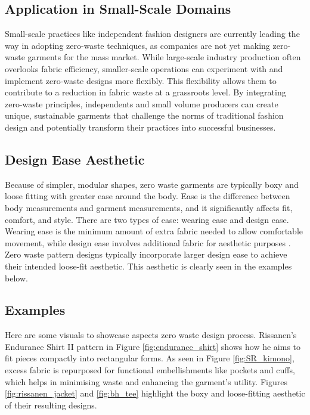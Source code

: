 \subsection{Application in Small-Scale Domains}
Small-scale practices like independent fashion designers are currently leading the way in adopting zero-waste techniques, as companies are not yet making zero-waste garments for the mass market. While large-scale industry production often overlooks fabric efficiency, smaller-scale operations can experiment with and implement zero-waste designs more flexibly. This flexibility allows them to contribute to a reduction in fabric waste at a grassroots level. By integrating zero-waste principles, independents and small volume producers can create unique, sustainable garments that challenge the norms of traditional fashion design and potentially transform their practices into successful businesses.

\subsection{Design Ease Aesthetic}
Because of simpler, modular shapes, zero waste garments are typically boxy and loose fitting with greater ease around the body. Ease is the difference between body measurements and garment measurements, and it significantly affects fit, comfort, and style. There are two types of ease: wearing ease and design ease. Wearing ease is the minimum amount of extra fabric needed to allow comfortable movement, while design ease involves additional fabric for aesthetic purposes \cite{tessa_what_2022}. Zero waste pattern designs typically incorporate larger design ease to achieve their intended loose-fit aesthetic. This aesthetic is clearly seen in the examples below.

\subsection{Examples}
Here are some visuals to showcase aspects zero waste design process. Rissanen's Endurance Shirt II pattern in Figure \ref{fig:endurance_shirt} shows how he aims to fit pieces compactly into rectangular forms. As seen in Figure \ref{fig:SR_kimono}, excess fabric is repurposed for functional embellishments like pockets and cuffs, which helps in minimising waste and enhancing the garment's utility. Figures \ref{fig:rissanen_jacket} and \ref{fig:bh_tee} highlight the boxy and loose-fitting aesthetic of their resulting designs.

